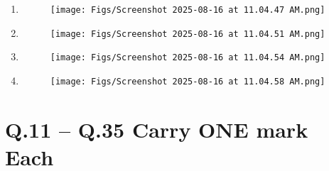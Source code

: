 \documentclass[12pt]{article}
\begin{document}
\begin{enumerate}
\begin{enumerate}
    

\item \begin{figure}[H]
\centering
\texttt{[image: Figs/Screenshot 2025-08-16 at 11.04.47 AM.png]}
\caption{}
\end{figure}
\item \begin{figure}[H]
\centering
\texttt{[image: Figs/Screenshot 2025-08-16 at 11.04.51 AM.png]}
\caption{}
\end{figure}
\item \begin{figure}[H]
\centering
\texttt{[image: Figs/Screenshot 2025-08-16 at 11.04.54 AM.png]}
\caption{}
\end{figure}
\item \begin{figure}[H]
\centering
\texttt{[image: Figs/Screenshot 2025-08-16 at 11.04.58 AM.png]}
\caption{}
\end{figure}
\end{enumerate}




\end{enumerate}


\section*{Q.11 – Q.35 Carry ONE mark Each}
\end{document}
